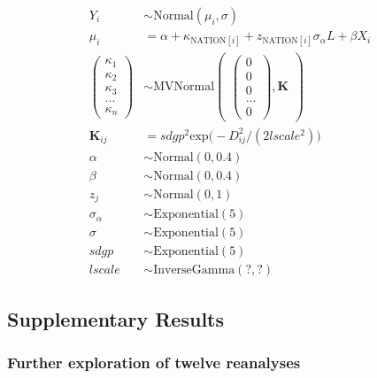 \documentclass[
  man,floatsintext]{apa6}
\begin{document}
\[
\begin{aligned}
Y_{i} &\sim \text{Normal}(\mu_{i},\sigma) \\
\mu_{i} &= \alpha + \kappa_{\text{NATION}[i]} + z_{\text{NATION}[i]}\sigma_{\alpha}L + \beta X_{i} \\
\begin{pmatrix}
\kappa_{1} \\ \kappa_{2} \\ \kappa_{3} \\ ... \\ \kappa_{n}
\end{pmatrix} &\sim \text{MVNormal}
\begin{pmatrix}
\begin{pmatrix}
0 \\ 0 \\ 0 \\ ... \\ 0
\end{pmatrix},\textbf{K}
\end{pmatrix}\\
\textbf{K}_{ij} &= sdgp^2 \text{exp} \big (-D_{ij}^2 / (2 lscale^2) \big )\\
\alpha &\sim \text{Normal}(0, 0.4) \\
\beta &\sim \text{Normal}(0, 0.4) \\
z_{j} &\sim \text{Normal}(0, 1)\\
\sigma_{\alpha} &\sim \text{Exponential}(5) \\
\sigma &\sim \text{Exponential}(5) \\
sdgp &\sim \text{Exponential}(5) \\
lscale &\sim \text{InverseGamma}(?,?)
\end{aligned}
\]

\newpage

\hypertarget{supplementary-results}{%
\subsection{Supplementary Results}\label{supplementary-results}}

\hypertarget{further-exploration-of-twelve-reanalyses}{%
\subsubsection{Further exploration of twelve reanalyses}\label{further-exploration-of-twelve-reanalyses}}
\end{document}
